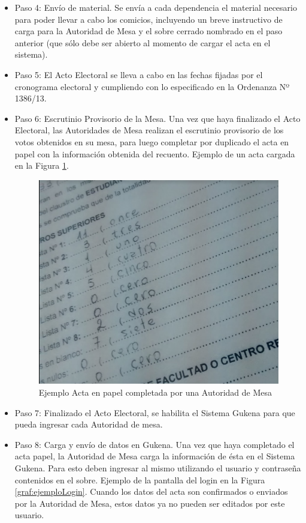 \begin{itemize}
\item Paso 4: Envío de material. Se envía a cada dependencia el material necesario para poder llevar a cabo los comicios, incluyendo un breve instructivo de carga para la Autoridad de Mesa y el sobre cerrado nombrado en el paso anterior (que sólo debe ser abierto al momento de cargar el acta en el sistema).
\item Paso 5: El Acto Electoral se lleva a cabo en las fechas fijadas por el cronograma electoral y cumpliendo con lo especificado en la Ordenanza Nº 1386/13.
\item Paso 6: Escrutinio Provisorio de la Mesa. 
Una vez que haya finalizado el Acto Electoral, las Autoridades de Mesa realizan el escrutinio provisorio de los votos obtenidos en su mesa, para luego completar por duplicado el acta en papel con la información obtenida del recuento. Ejemplo de un acta cargada en la Figura \ref{graf:ejemploActa}.

\begin{figure}[h!]
    \begin{center}
        \includegraphics[scale=0.25]{img/f4P4qmrKXY.png}
    \end{center}
  \caption{Ejemplo Acta en papel completada por una Autoridad de Mesa}
  \label{graf:ejemploActa}
\end{figure}

\item Paso 7: Finalizado el Acto Electoral, se habilita el Sistema Gukena para que pueda ingresar cada Autoridad de mesa.
\item Paso 8: Carga y envío de datos en Gukena. Una vez que haya completado el acta papel, la Autoridad de Mesa carga la información de ésta en el Sistema Gukena. Para esto deben ingresar al mismo utilizando el usuario y contraseña contenidos en el sobre. Ejemplo de la pantalla del login en la Figura \ref{graf:ejemploLogin}.
Cuando los datos del acta son confirmados o enviados por la Autoridad de Mesa, estos datos ya no pueden ser editados por este usuario.


\end{itemize}
